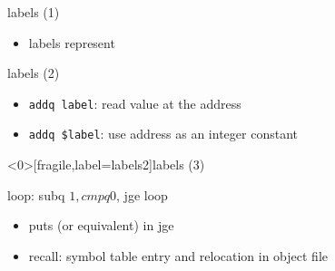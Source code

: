 \begin{frame}[fragile,label=labels0]{labels (1)}
    \begin{itemize}
    \item labels represent 
    \end{itemize}
\end{frame}

\begin{frame}[fragile,label=labels1]{labels (2)}
\begin{itemize}
    \item {\tt addq label}: read value at the address
    \item {\tt addq \$label}: use address as an integer constant
\end{itemize}
\end{frame}

\begin{frame}<0>[fragile,label=labels2]{labels (3)}
\begin{asmcodeS}
loop:    
    subq $1, %
    cmpq $0, %
    jge loop
\end{asmcodeS}
\begin{itemize}
    \item puts  {\small (or equivalent)} in {\keywordstyle jge} 
    \item recall: symbol table entry and relocation in object file
\end{itemize}
\end{frame}


